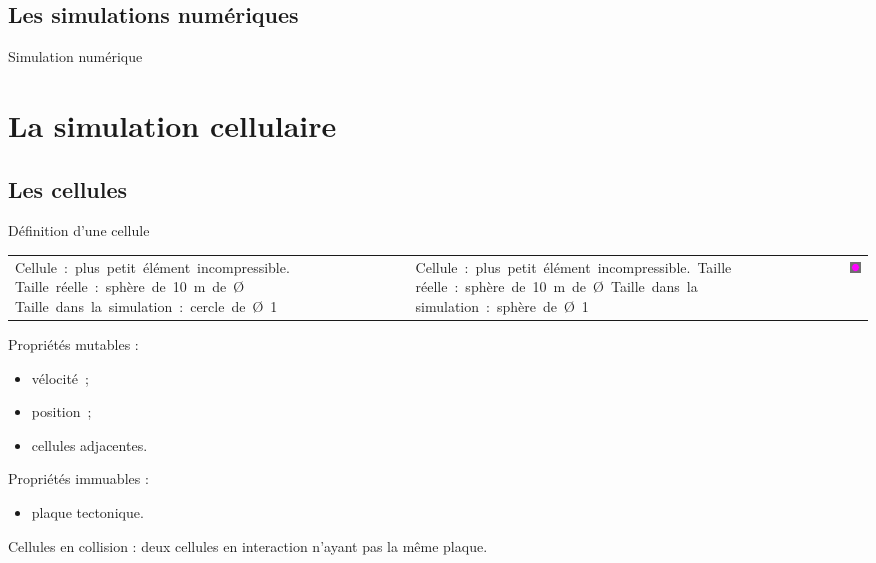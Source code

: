 \documentclass{beamer}
\begin{document}
\subsection{Les simulations numériques}
\begin{frame}{Simulation numérique}
  \begin{center}
    \begin{figure}
    \end{figure}
  \end{center}
\end{frame}

\section{La simulation cellulaire}

\subsection{Les cellules}
\begin{frame}{Définition d'une cellule}
  \begin{tabular}{m{8cm}m{1cm}m{2cm}}
    \mbox{Cellule : plus petit élément incompressible.}
    \mbox{Taille réelle : sphère de 10 m de Ø}
    \mbox{Taille dans la simulation : cercle de Ø 1} &&
    \mbox{Cellule : plus petit élément incompressible. Taille}
    \mbox{réelle : sphère de 10 m de Ø Taille dans la}
    \mbox{simulation : sphère de Ø 1} &&
    \includegraphics[width=1.5cm]{Images/cellule.png}
  \end{tabular}
  Propriétés mutables :
  \begin{itemize}
   \item vélocité~;
   \item position~;
   \item cellules adjacentes.
  \end{itemize}
  Propriétés immuables :
  \begin{itemize}
   \item plaque tectonique.\\
  \end{itemize}
  \smallbreak
  Cellules en collision : deux cellules en interaction n'ayant pas la même plaque.
\end{frame}
\end{document}
